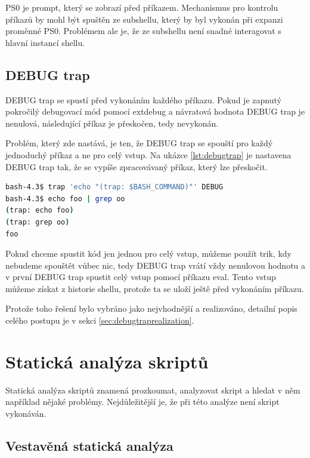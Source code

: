 \documentclass[thesis=M,czech]{FITthesis}[2012/06/26]
\begin{document}
PS0 je prompt, který se zobrazí před  příkazem. Mechanismus pro kontrolu příkazů by mohl být spuštěn ze subshellu, který by byl vykonán při expanzi proměnné PS0. Problémem ale je, že ze subshellu není snadné interagovat s hlavní instancí shellu.

%
%
\subsection{DEBUG trap}

DEBUG trap se spustí před vykonáním každého příkazu. Pokud je zapnutý pokročilý debugovací mód pomocí extdebug a návratová hodnota DEBUG trap je nenulová, následující příkaz je přeskočen, tedy nevykonán.

Problém, který zde nastává, je ten, že DEBUG trap se spouští pro každý jednoduchý příkaz a ne pro celý vstup. Na ukázce \ref{lst:debugtrap} je nastavena DEBUG trap tak, že se vypíše zpracovávaný příkaz, který lze přeskočit.

\begin{lstlisting}[language=bash, caption={DEBUG trap}, label={lst:debugtrap}]
bash-4.3$ trap 'echo "(trap: $BASH_COMMAND)"' DEBUG
bash-4.3$ echo foo | grep oo
(trap: echo foo)
(trap: grep oo)
foo
\end{lstlisting}

Pokud chceme spustit kód jen jednou pro celý vstup, můžeme použít trik, kdy nebudeme spouštět vůbec nic, tedy DEBUG trap vrátí vždy nenulovou hodnotu a v první DEBUG trap spustit celý vstup pomocí příkazu eval. Tento vstup můžeme získat z historie shellu, protože ta se uloží ještě před vykonáním příkazu.

Protože toho řešení bylo vybráno jako nejvhodnější a realizováno, detailní popis celého postupu je v sekci \ref{sec:debugtraprealization}.




\section{Statická analýza skriptů}

Statická analýza skriptů znamená prozkoumat, analyzovat skript a hledat v něm například nějaké problémy. Nejdůležitější je, že při této analýze není skript vykonáván.


%
%
\subsection{Vestavěná statická analýza}
\end{document}
